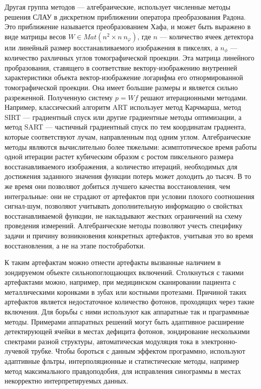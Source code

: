 Другая группа методов --- алгебраические, использует численные методы решения СЛАУ в дискретном приближении оператора преобразования Радона.
Это приближение называется преобразованием Хафа, и может быть выражено в виде матрицы весов $W \in Mat\left(n^2 \times n ~ n_\varphi\right)$, где $n$ --- количество ячеек детектора или линейный размер восстанавливаемого изображения в пикселях, а $n_\phi$ --- количество рахличных углов томографической проекции.
Эта матрица линейного пробразования, ставящего в соответствие вектору-изображению внутренней характеристики объекта вектор-изображение логарифма его отнормированной томографической проекции.
Она имеет большие размеры и является сильно разреженной.
Полученную систему $p = Wf$ решают итерационными методами.
Например, классический алгоритм ART использует метод Карчмарша, метод SIRT --- градиентный спуск или другие градиентные методы оптимизации, а метод SART --- частичный градиентный спуск по тем координатам градиента, которые соответствуют лучам, направленным под одним углом.
Алгебраические методы являются вычислительно более тяжелыми:
асимптотическое время работы одной итерации растет кубическим образом с ростом пиксельного размера восстанавливаемого изображения, а количество итераций, необходимых для достижения заданного значения функции потерь может доходить до тысяч.
В то же время они позволяют добиться лучшего качества восстановления, чем интегральные: они не страдают от артефактов при условии плохого соотношения сигнал-шум, позволяют учитывать дополнительную информацию о свойствах восстанавливаемой функции, не накладывают жестких ограничений на схему проведения измерений. 
Алгебраические методы позволяют учесть специфику задачи и причину возникновения конкретных артефактов, учитывая это во время восстановления, а не на этапе постобработки.

К таким артефактам можно отнести артефакты вызванные наличием в зондируемом объекте сильнопоглощающих включений.
Столкнуться с такими артефактами можно, например, при медицинском сканировании пациента с металлическими коронками в зубах или костными протезами.
Причиной таких артефактов является недостаточное количество фотонов, проходящих через такие включения.
Для борьбы с ними используют как аппаратные так и праграммные методы.
Примерами аппаратных решений могут быть адаптивное расширение детектирующей ячейки в местах дефицита фотонов, зондирование несколькими спектрами разной структуры, автоматическая модуляция тока в электронно-лучевой трубке.
Чтобы бороться с данным эффектом программно, используют адаптивные фльтры, интерполяционные и статистические методы, например метод максимального правдоподобия, для исправления синограммы в местах некорректно интерпретируемых данных.

